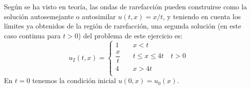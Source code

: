 \documentclass[12pt]{article}
\begin{document}
\begin{ejercicio}
        Según se ha visto en teoría, las ondas de rarefacción pueden construirse como la solución autosemejante o autosimilar $u(t,x) = x/t$,
        y teniendo en cuenta los límites ya obtenidos de la región de rarefacción, una segunda solución (en este caso continua para $t > 0$)
        del problema de este ejercicio es:
        $$\boxed{u_2(t,x) = \begin{cases}
            1 \quad& x < t \\
            \dfrac{x}{t} \quad& t \leq x \leq 4t \quad t > 0\\
            4 \quad& x > 4t \\
        \end{cases}}$$
        En $t=0$ tenemos la condición inicial $u(0,x) = u_0(x)$.
    \end{ejercicio}
    
\end{document}
